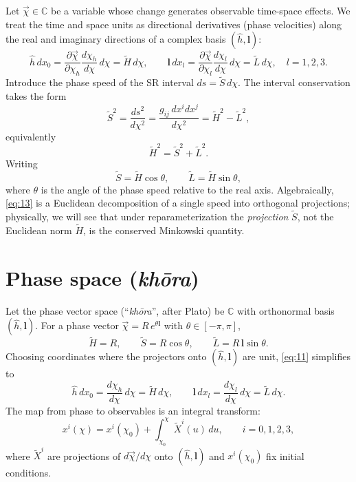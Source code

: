 \documentclass[11pt]{article}
\numberwithin{equation}{section}
\begin{document}
Let $\vec{\chi}\in\mathbb{C}$ be a variable whose change generates observable time-space effects. We treat the time and space units as directional derivatives (phase velocities) along the real and imaginary directions of a complex basis $(\hat{h},\mathbf{l})$:
\begin{equation}
\hat{h}\,dx_0=\frac{\partial\vec{\chi}}{\partial\chi_h}\frac{d\chi_h}{d\chi}\,d\chi
=\tilde{H}\,d\chi,\qquad
\mathbf{l}\,dx_l=\frac{\partial\vec{\chi}}{\partial\chi_l}\frac{d\chi_l}{d\chi}\,d\chi
=\tilde{L}\,d\chi,\quad l=1,2,3.
\label{eq:11}
\end{equation}
Introduce the phase speed of the SR interval $ds=\tilde{S}\,d\chi$. The interval conservation takes the form
\begin{equation}
\tilde{S}^2=\frac{ds^2}{d\chi^2}
=\frac{g_{ij}\,dx^i dx^j}{d\chi^2}
=\tilde{H}^2-\tilde{L}^2,
\label{eq:12}
\end{equation}
equivalently
\begin{equation}
\tilde{H}^2=\tilde{S}^2+\tilde{L}^2.
\label{eq:13}
\end{equation}
Writing 
\begin{equation}
\tilde{S}=\tilde{H}\cos\theta,\qquad \tilde{L}=\tilde{H}\sin\theta,
\label{eq:14}
\end{equation}
where $\theta$ is the angle of the phase speed relative to the real axis. Algebraically, \eqref{eq:13} is a Euclidean decomposition of a single speed into orthogonal projections; physically, we will see that under reparameterization the \emph{projection} $\tilde{S}$, not the Euclidean norm $\tilde{H}$, is the conserved Minkowski quantity.

\section{Phase space (\textit{kh\={o}ra})}
Let the phase vector space (``\emph{kh\={o}ra}'', after Plato) be $\mathbb{C}$ with orthonormal basis $(\hat{h},\mathbf{l})$. For a phase vector $\vec{\chi}=R\,e^{\theta\mathbf{l}}$ with $\theta\in[-\pi,\pi]$,
\begin{equation}
\tilde{H}=R,\qquad \tilde{S}=R\cos\theta,\qquad \tilde{L}=R\,\mathbf{l}\sin\theta.
\label{eq:21}
\end{equation}
Choosing coordinates where the projectors onto $(\hat{h},\mathbf{l})$ are unit, \eqref{eq:11} simplifies to
\begin{equation}
\hat{h}\,dx_0=\frac{d\chi_h}{d\chi}\,d\chi=\tilde{H}\,d\chi,\qquad
\mathbf{l}\,dx_l=\frac{d\chi_l}{d\chi}\,d\chi=\tilde{L}\,d\chi.
\label{eq:22}
\end{equation}
The map from phase to observables is an integral transform:
\begin{equation}
x^i(\chi)=x^i(\chi_0)+\int_{\chi_0}^{\chi}\tilde{X}^i(u)\,du,\qquad i=0,1,2,3,
\label{eq:23}
\end{equation}
where $\tilde{X}^i$ are projections of $d\vec{\chi}/d\chi$ onto $(\hat{h},\mathbf{l})$ and $x^i(\chi_0)$ fix initial conditions.
\end{document}
